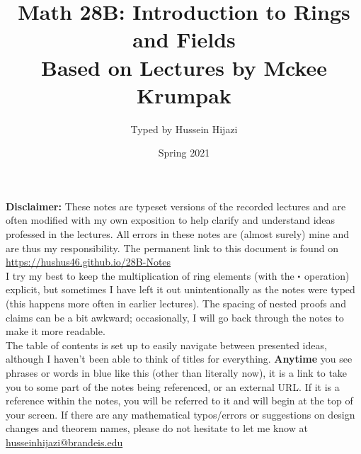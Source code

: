 \documentclass[../Main.tex]{subfiles}
\begin{document}
\title{\textbf {Math 28B: Introduction to Rings and Fields}\\[0.2em]\large Based on Lectures by Mckee Krumpak\vspace{-2ex} }
\author{Typed by Hussein Hijazi}
\date{Spring 2021}
\begin{minipage}{\textwidth}
\maketitle
\textbf{Disclaimer:} These notes are typeset versions of the recorded lectures and are often modified with my own exposition to help clarify and understand ideas professed in the lectures. All errors in these notes are (almost surely) mine and are thus my responsibility. The permanent link to this document is found on \href{https://hushus46.github.io/28B-Notes/}{https://hushus46.github.io/28B-Notes}\\

I try my best to keep the multiplication of ring elements (with the $\rdot $ operation) explicit, but sometimes I have left it out unintentionally as the notes were typed (this happens more often in earlier lectures). The spacing of nested proofs and claims can be a bit awkward; occasionally, I will go back through the notes to make it more readable.\\

The table of contents is set up to easily navigate between presented ideas, although I haven't been able to think of titles for everything. \textbf{Anytime} you see phrases or words in {\color{blue}blue like this} (other than literally now), it is a link to take you to some part of the notes being referenced, or an external URL. If it is a reference within the notes, you will be referred to it and will begin at the top of your screen. If there are any mathematical typos/errors or suggestions on design changes and theorem names, please do not hesitate to let me know at \href{mailto:husseinhijazi@brandeis.edu}{husseinhijazi@brandeis.edu}
\end{minipage}
\end{document}

